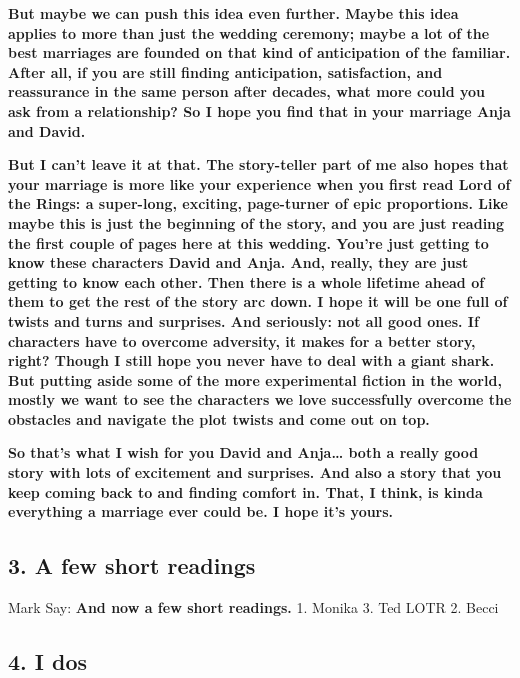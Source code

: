 \textbf{But maybe we can push this idea even further. Maybe this idea
applies to more than just the wedding ceremony; maybe a lot of the best
marriages are founded on that kind of anticipation of the familiar.
After all, if you are still finding anticipation, satisfaction, and
reassurance in the same person after decades, what more could you ask
from a relationship? So I hope you find that in your marriage Anja and
David.}

\textbf{But I can't leave it at that. The story-teller part of me also
hopes that your marriage is more like your experience when you first
read Lord of the Rings: a super-long, exciting, page-turner of epic
proportions. Like maybe this is just the beginning of the story, and you
are just reading the first couple of pages here at this wedding. You're
just getting to know these characters David and Anja. And, really, they
are just getting to know each other. Then there is a whole lifetime
ahead of them to get the rest of the story arc down. I hope it will be
one full of twists and turns and surprises. And seriously: not all good
ones. If characters have to overcome adversity, it makes for a better
story, right? Though I still hope you never have to deal with a giant
shark. But putting aside some of the more experimental fiction in the
world, mostly we want to see the characters we love successfully
overcome the obstacles and navigate the plot twists and come out on
top.}

\textbf{So that's what I wish for you David and Anja\ldots{} both a
really good story with lots of excitement and surprises. And also a
story that you keep coming back to and finding comfort in. That, I
think, is kinda everything a marriage ever could be. I hope it's yours.}

\hypertarget{a-few-short-readings}{%
\subsection{3. A few short readings}\label{a-few-short-readings}}

Mark Say: \textbf{And now a few short readings.} 1. Monika 3. Ted LOTR
2. Becci

\hypertarget{i-dos}{%
\subsection{4. I dos}\label{i-dos}}

